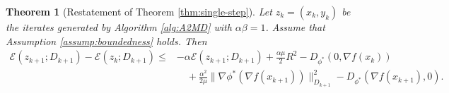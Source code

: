 \documentclass{article}
\theoremstyle{plain}
\newtheorem*{theorem*}{Theorem}
\theoremstyle{remark}
\begin{document}

\begin{theorem*}[Restatement of Theorem \ref{thm:single-step}]
Let $z_k=(x_k,y_k)$ be the iterates generated by Algorithm \ref{alg:A2MD} with $\alpha\beta=1$. Assume that Assumption \ref{assump:boundedness} holds. Then
$$
\begin{aligned}
\mathcal{E}(z_{k+1};D_{k+1}) - \mathcal{E}(z_k;D_{k+1})
\le{}& -\alpha \mathcal{E}(z_{k+1};D_{k+1}) + \frac{\alpha\mu}{2}R^2 -  D_{\phi^*}(0,\nabla f(x_{k}))
\\
&\quad + \frac{\alpha^2}{2\mu}\|\nabla \phi^*(\nabla f(x_{k+1}))\|_{D_{k+1}}^2 -  D_{\phi^*}(\nabla f(x_{k+1}),0).
\end{aligned}
$$
\end{theorem*}
\end{document}
